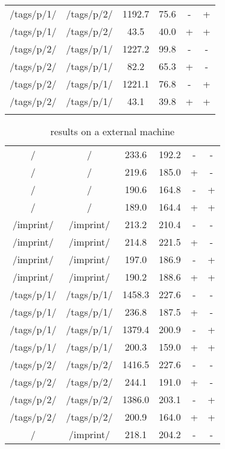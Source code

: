 \begin{appendix}
\begin{center}
\begin{longtable}{cccccc}
/tags/p/1/ & /tags/p/2/ & 1192.7 & 75.6 & - & + \\
/tags/p/1/ & /tags/p/2/ & 43.5 & 40.0 & + & + \\
\hline
/tags/p/2/ & /tags/p/1/ & 1227.2 & 99.8 & - & - \\
/tags/p/2/ & /tags/p/1/ & 82.2 & 65.3 & + & - \\
/tags/p/2/ & /tags/p/1/ & 1221.1 & 76.8 & - & + \\
/tags/p/2/ & /tags/p/1/ & 43.1 & 39.8 & + & + \\
\hline
\label{tab:curl_results_local}
\end{longtable}
\end{center}

\newpage{}

\begin{center}
\footnotesize
\begin{longtable}{cccccc}
    \caption{\curl{} results on a external machine}
    \\
	\hline
	\thead{From} & \thead{To} & \thead{Common} & \thead{\lare{}} & \thead{DC} & \thead{TC}\\
	\hline
\hline
/ & / & 233.6 & 192.2 & - & - \\
/ & / & 219.6 & 185.0 & + & - \\
/ & / & 190.6 & 164.8 & - & + \\
/ & / & 189.0 & 164.4 & + & + \\
\hline
/imprint/ & /imprint/ & 213.2 & 210.4 & - & - \\
/imprint/ & /imprint/ & 214.8 & 221.5 & + & - \\
/imprint/ & /imprint/ & 197.0 & 186.9 & - & + \\
/imprint/ & /imprint/ & 190.2 & 188.6 & + & + \\
\hline
/tags/p/1/ & /tags/p/1/ & 1458.3 & 227.6 & - & - \\
/tags/p/1/ & /tags/p/1/ & 236.8 & 187.5 & + & - \\
/tags/p/1/ & /tags/p/1/ & 1379.4 & 200.9 & - & + \\
/tags/p/1/ & /tags/p/1/ & 200.3 & 159.0 & + & + \\
\hline
/tags/p/2/ & /tags/p/2/ & 1416.5 & 227.6 & - & - \\
/tags/p/2/ & /tags/p/2/ & 244.1 & 191.0 & + & - \\
/tags/p/2/ & /tags/p/2/ & 1386.0 & 203.1 & - & + \\
/tags/p/2/ & /tags/p/2/ & 200.9 & 164.0 & + & + \\
\hline
\hline
/ & /imprint/ & 218.1 & 204.2 & - & - \\

\end{longtable}
\end{center}
\end{appendix}
